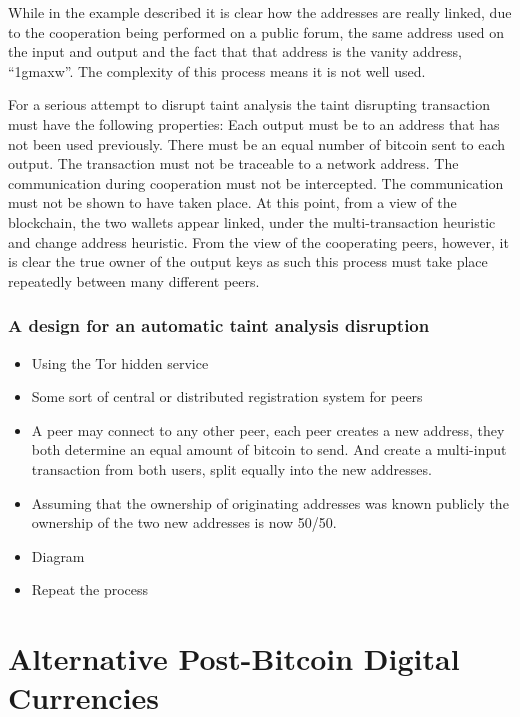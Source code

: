 While in the example described it is clear how the addresses are really linked,
due to the cooperation being performed on a public forum, the same address used
on the input and output and the fact that that address is the vanity address,
``1gmaxw''. The complexity of this process means it is not well used.

For a serious attempt to disrupt taint analysis the taint disrupting transaction
must have the following properties:  Each output must be to an address that has
not been used previously. There must be an equal number of bitcoin sent to each
output. The transaction must not be traceable to a network address.  The
communication during cooperation must not be intercepted. The communication must
not be shown to have taken place.  At this point, from a view of the blockchain,
the two wallets appear linked, under the multi-transaction heuristic and change
address heuristic. From the view of the cooperating peers, however, it is clear
the true owner of the output keys as such this process must take place
repeatedly between many different peers.

\subsubsection{A design for an automatic taint analysis disruption}

\begin{itemize} \item Using the Tor hidden service \item Some sort of central or
        distributed registration system for peers \item A peer may connect to
            any other peer, each peer creates a new address, they both determine
            an equal amount of bitcoin to send. And create a multi-input
            transaction from both users, split equally into the new addresses.
\item Assuming that the ownership of originating addresses was known publicly
the ownership of the two new addresses is now 50/50.  \item Diagram \item Repeat
the process \end{itemize}

\section{Alternative Post-Bitcoin Digital Currencies}

